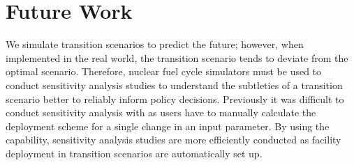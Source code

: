 \section{Future Work}
We simulate transition scenarios to predict the future; 
however, when implemented in the real world, the transition 
scenario tends to deviate from the optimal scenario.
Therefore, nuclear fuel cycle simulators must be used to conduct
sensitivity analysis studies to understand the subtleties of 
a transition scenario better to reliably inform policy decisions.
Previously it was difficult to conduct sensitivity analysis with \Cyclus 
as users have to manually calculate the deployment scheme for a 
single change in an input parameter. 
By using the \deploy capability,
sensitivity analysis studies are more efficiently 
conducted as facility deployment in transition scenarios 
are automatically set up. 